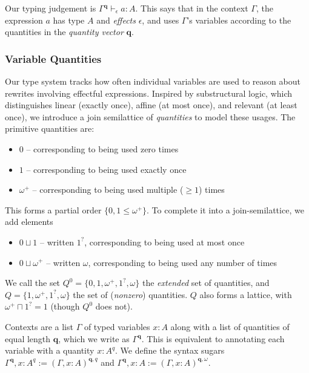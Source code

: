 \documentclass[acmsmall,screen,review]{acmart}
\newcommand{\mb}[1]{\ensuremath{\mathbf{#1}}}
\newcommand{\hasty}[4]{#1 \vdash_{#2} #3: {#4}}
\newcommand{\zeroq}{0}
\newcommand{\oneq}{1}
\newcommand{\delq}{1^?}
\newcommand{\cpyq}{\omega^+}
\newcommand{\topq}{\omega}
\begin{document}
Our typing judgement is $\hasty{\Gamma^{\mb{q}}}{\epsilon}{a}{A}$.
This says that in the context $\Gamma$, the expression $a$ has type $A$ and \emph{effects}
$\epsilon$, and uses $\Gamma$'s variables according to the quantities in the
\emph{quantity vector} $\mb{q}$.

\subsubsection{Variable Quantities}

Our type system tracks how often individual variables are used to reason about rewrites
involving effectful expressions. Inspired by substructural logic, which distinguishes linear
(exactly once), affine (at most once), and relevant (at least once), we introduce a join semilattice
of \emph{quantities} to model these usages. The primitive quantities are:
\begin{itemize}
  \item $\zeroq$ -- corresponding to being used zero times
  \item $\oneq$ -- corresponding to being used exactly once
  \item $\cpyq$ -- corresponding to being used multiple ($\geq 1$) times
\end{itemize}
This forms a partial order $\{\zeroq, \oneq \leq \cpyq\}$. To complete it into a join-semilattice, we add elements
\begin{itemize}
  \item $\zeroq \sqcup \oneq$ -- written $\delq$, corresponding to being used at most once
  \item $\zeroq \sqcup \cpyq$ -- written $\topq$, corresponding to being used any number of times
\end{itemize}
We call the set $Q^0 = \{\zeroq, \oneq, \cpyq, \delq, \topq\}$ the \emph{extended} set of
quantities, and $Q = \{\oneq, \cpyq, \delq, \topq\}$ the set of (\emph{nonzero}) quantities. $Q$ also forms a lattice, with $\cpyq \sqcap \delq = \oneq$ (though $Q^0$ does not).

Contexts are a list $\Gamma$ of typed variables $x : A$ along with a list of quantities of equal
length $\mb{q}$, which we write as $\Gamma^{\mb{q}}$. This is equivalent to annotating each variable  with a quantity $x : A^q$. We define the syntax sugars
  $\Gamma^{\mb{q}}, x : A^q := (\Gamma, x : A)^{\mb{q}, q}$ and
  $\Gamma^{\mb{q}}, x : A :=  (\Gamma, x : A)^{\mb{q}, \topq}$.
\end{document}

